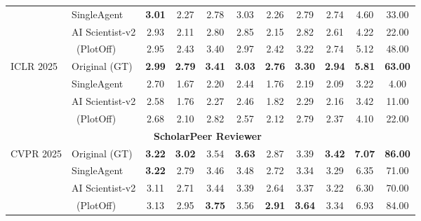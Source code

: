 \begin{table}[tbp]
{\begin{tabular}{llccccccccc}
        \cmidrule{2-11}
        & SingleAgent      & \cellcolor{best_color}\textbf{3.01} & 2.27 & 2.78 & \cellcolor{best_color}3.03 & 2.26 & 2.79 & \cellcolor{best_color}2.74 & 4.60 & 33.00 \\
        & AI Scientist-v2  & 2.93 & 2.11 & 2.80 & 2.85 & 2.15 & 2.82 & 2.61 & 4.22 & 22.00 \\
        & \ourmethod{}~(PlotOff)     & 2.95 & \cellcolor{best_color}2.43 & \cellcolor{best_color}3.40 & 2.97 & \cellcolor{best_color}2.42 & \cellcolor{best_color}3.22 & \cellcolor{best_color}2.74 & \cellcolor{best_color}5.12 & \cellcolor{best_color}48.00 \\
        \midrule
        \multirow{4}{*}{ICLR 2025} 
        & Original (GT)   & \textbf{2.99} & \textbf{2.79} & \textbf{3.41} & \textbf{3.03} & \textbf{2.76} & \textbf{3.30} & \textbf{2.94} & \textbf{5.81} & \textbf{63.00} \\
        \cmidrule{2-11}
        & SingleAgent     & \cellcolor{best_color}2.70 & 1.67 & 2.20 & 2.44 & 1.76 & 2.19 & 2.09 & 3.22 & 4.00 \\
        & AI Scientist-v2 & 2.58 & 1.76 & 2.27 & 2.46 & 1.82 & 2.29 & 2.16 & 3.42 & 11.00 \\
        & \ourmethod{}~(PlotOff)     & 2.68 & \cellcolor{best_color}2.10 & \cellcolor{best_color}2.82 & \cellcolor{best_color}2.57 & \cellcolor{best_color}2.12 & \cellcolor{best_color}2.79 & \cellcolor{best_color}2.37 & \cellcolor{best_color}4.10 & \cellcolor{best_color}22.00 \\
        \midrule
        \multicolumn{11}{c}{\cellcolor{gray!15}\textbf{ScholarPeer Reviewer~\citep{goyal2026scholarpeer}}} \\
        \midrule
        \multirow{4}{*}{CVPR 2025} 
        & Original (GT)   & \textbf{3.22} & \textbf{3.02} & 3.54 & \textbf{3.63} & 2.87 & 3.39 & \textbf{3.42} & \textbf{7.07} & \textbf{86.00} \\
        \cmidrule{2-11}
        & SingleAgent     & \cellcolor{best_color}\textbf{3.22} & 2.79 & 3.46 & 3.48 & 2.72 & 3.34 & 3.29 & 6.35 & 71.00 \\
        & AI Scientist-v2 & 3.11 & 2.71 & 3.44 & 3.39 & 2.64 & 3.37 & 3.22 & 6.30 & 70.00 \\
        & \ourmethod{}~(PlotOff)  & 3.13 & \cellcolor{best_color}2.95 & \cellcolor{best_color}\textbf{3.75} & \cellcolor{best_color}3.56 & \cellcolor{best_color}\textbf{2.91} & \cellcolor{best_color}\textbf{3.64} & \cellcolor{best_color}3.34 & \cellcolor{best_color}6.93 & \cellcolor{best_color}84.00 \\

\end{tabular}}
\end{table}
